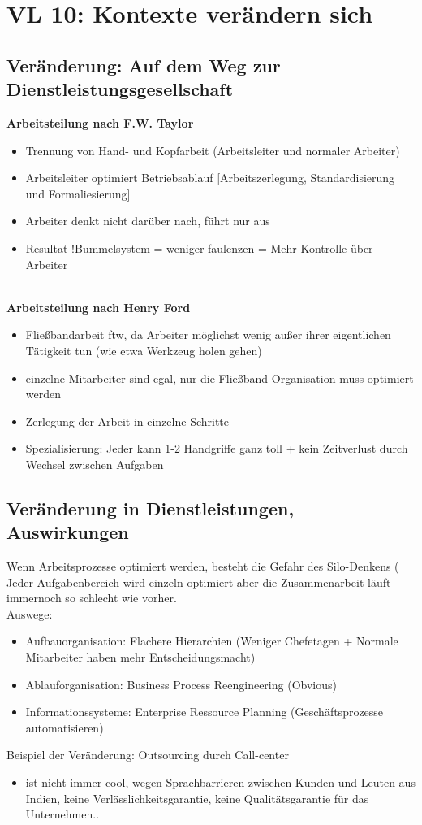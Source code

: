 \newpage
\section{VL 10: Kontexte verändern sich}
\subsection{Veränderung: Auf dem Weg zur Dienstleistungsgesellschaft}
\begin{multicols}{2}
\textbf{Arbeitsteilung nach F.W. Taylor}
\begin{itemize}
\item Trennung von Hand- und Kopfarbeit (Arbeitsleiter und normaler Arbeiter)
\item Arbeitsleiter optimiert Betriebsablauf [Arbeitszerlegung, Standardisierung und Formaliesierung]
\item Arbeiter denkt nicht darüber nach, führt nur aus
\item Resultat $!$Bummelsystem = weniger faulenzen = Mehr Kontrolle über Arbeiter \\
\\
\end{itemize}
\textbf{Arbeitsteilung nach Henry Ford}
\begin{itemize}
\item Fließbandarbeit ftw, da Arbeiter möglichst wenig außer ihrer eigentlichen Tätigkeit tun (wie etwa Werkzeug holen gehen)
\item einzelne Mitarbeiter sind egal, nur die Fließband-Organisation muss optimiert werden
\item Zerlegung der Arbeit in einzelne Schritte
\item Spezialisierung: Jeder kann 1-2 Handgriffe ganz toll + kein Zeitverlust durch Wechsel zwischen Aufgaben
\end{itemize}
\end{multicols}

\subsection{Veränderung in Dienstleistungen, Auswirkungen}
Wenn Arbeitsprozesse optimiert werden, besteht die Gefahr des Silo-Denkens ( Jeder Aufgabenbereich wird einzeln optimiert aber die Zusammenarbeit läuft immernoch so schlecht wie vorher. \\
Auswege:
\begin{itemize}
\item Aufbauorganisation: Flachere Hierarchien (Weniger Chefetagen + Normale Mitarbeiter haben mehr Entscheidungsmacht)
\item Ablauforganisation: Business Process Reengineering (Obvious)
\item Informationssysteme: Enterprise Ressource Planning (Geschäftsprozesse automatisieren)
\end{itemize}
Beispiel der Veränderung: Outsourcing durch Call-center
\begin{itemize}
\item ist nicht immer cool, wegen Sprachbarrieren zwischen Kunden und Leuten aus Indien, keine Verlässlichkeitsgarantie, keine Qualitätsgarantie für das Unternehmen..
\end{itemize}
